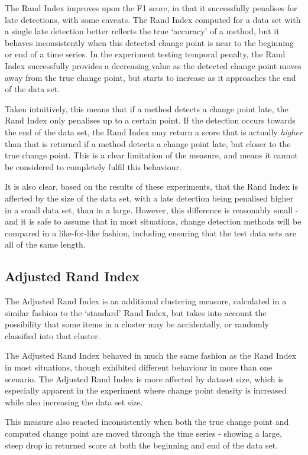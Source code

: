 \documentclass{uvamscse}	%
\begin{document}
The Rand Index improves upon the F1 score, in that it successfully penalises for late detections, with some caveats. The Rand Index computed for a data set with a single late detection better reflects the true `accuracy' of a method, but it behaves inconsistently when this detected change point is near to the beginning or end of a time series. In the experiment testing temporal penalty, the Rand Index successfully provides a decreasing value as the detected change point moves away from the true change point, but starts to increase as it approaches the end of the data set.

Taken intuitively, this means that if a method detects a change point late, the Rand Index only penalises up to a certain point. If the detection occurs towards the end of the data set, the Rand Index may return a score that is actually \emph{higher} than that is returned if a method detects a change point late, but closer to the true change point. This is a clear limitation of the measure, and means it cannot be considered to completely fulfil this behaviour.

It is also clear, based on the results of these experiments, that the Rand Index is affected by the size of the data set, with a late detection being penalised higher in a small data set, than in a large. However, this difference is reasonably small - and it is safe to assume that in most situations, change detection methods will be compared in a like-for-like fashion, including ensuring that the test data sets are all of the same length.

\subsection{Adjusted Rand Index}

The Adjusted Rand Index is an additional clustering measure, calculated in a similar fashion to the `standard' Rand Index, but takes into account the possibility that some items in a cluster may be accidentally, or randomly classified into that cluster.

The Adjusted Rand Index behaved in much the same fashion as the Rand Index in most situations, though exhibited different behaviour in more than one scenario. The Adjusted Rand Index is more affected by dataset size, which is especially apparent in the experiment where change point density is increased while also increasing the data set size.

This measure also reacted inconsistently when both the true change point and computed change point are moved through the time series - showing a large, steep drop in returned score at both the beginning and end of the data set.
\end{document}
